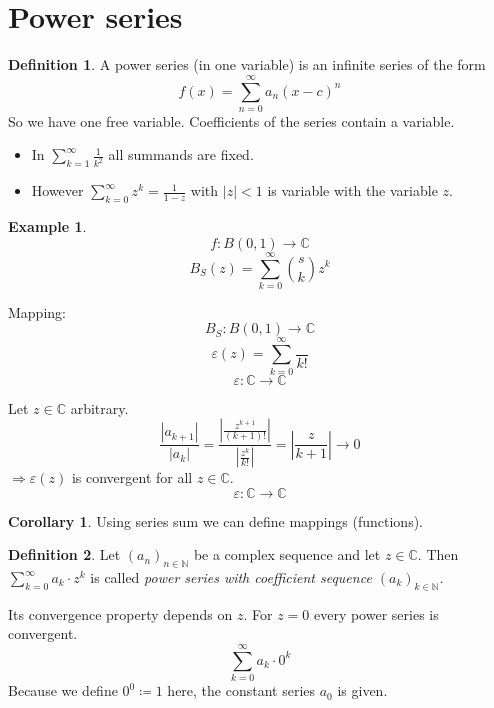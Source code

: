 \documentclass[a4paper,landscape,twocolumn]{article}
\theoremstyle{definition}
\newtheorem{defi}{Definition}
\newtheorem{ex}{Example}
\newtheorem{cor}{Corollary}
\newcommand\abs[1]{\left|#1\right|}
\newcommand\seq[1]{{\left(#1\right)}_{n \in \mathbb N}}
\begin{document}
\section{Power series}
\begin{defi}
  A power series (in one variable) is an infinite series of the form
  \[ f(x) = \sum_{n=0}^\infty a_n (x - c)^n \]
  So we have one free variable. Coefficients of the series contain a variable.

  \begin{itemize}
    \item In $\sum_{k=1}^\infty \frac{1}{k^2}$ all summands are fixed.
    \item However $\sum_{k=0}^\infty z^k = \frac{1}{1 - z}$ with $\abs{z} < 1$
      is variable with the variable $z$.
  \end{itemize}
\end{defi}
\begin{ex}
  \[ f: B(0,1) \rightarrow \mathbb C \]
  \[ B_S(z) = \sum_{k=0}^\infty {s \choose k} z^k \]

  Mapping:
  \[ B_S: B(0,1) \rightarrow \mathbb C \]
  \[ \varepsilon(z) = \sum_{k=0}^\infty \frac{}{k!} \] %
  \[ \varepsilon: \mathbb C \rightarrow \mathbb C \]

  Let $z \in \mathbb C$ arbitrary.
  \[
    \frac{\abs{a_{k+1}}}{\abs{a_k}}
    = \frac{\abs{\frac{z^{k+1}}{(k+1)!}}}{\abs{\frac{z^k}{k!}}}
    = \abs{\frac{z}{k+1}}
    \to 0
  \]
  $\Rightarrow \varepsilon(z)$ is convergent for all $z \in \mathbb C$.
  \[ \varepsilon: \mathbb C \to \mathbb C \]
\end{ex}
\begin{cor}
  Using series sum we can define mappings (functions).
\end{cor}
\begin{defi}
  Let $\seq{a_n}$ be a complex sequence and let $z \in \mathbb C$.
  Then $\sum_{k=0}^\infty a_k \cdot z^k$ is called \emph{power series with
  coefficient sequence $\left(a_k\right)_{k \in \mathbb N}$}.

  Its convergence property depends on $z$.
  For $z = 0$ every power series is convergent.
  \[ \sum_{k=0}^\infty a_k \cdot 0^k \]
  Because we define $0^0 \coloneqq 1$ here, the constant series $a_0$ is given.
\end{defi}
\end{document}
